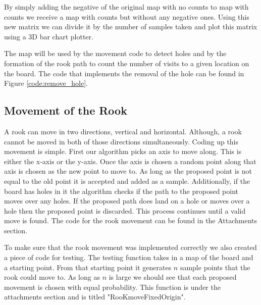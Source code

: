 \documentclass{amsart}
\numberwithin{equation}{section}
\begin{document}
By simply adding the negative of the original map with no counts to map with counts we receive a map with counts but without any negative ones. Using this new matrix we can divide it by the number of samples taken and plot this matrix using a 3D bar chart plotter. \par
The map will be used by the movement code to detect holes and by the formation of the rook path to count the number of visits to a given location on the board. The code that implements the removal of the hole can be found in Figure \ref{code:remove_hole}.

\subsection{Movement of the Rook}
A rook can move in two directions, vertical and horizontal. Although, a rook cannot be moved in both of those directions simultaneously. Coding up this movement is simple. First our algorithm picks an axis to move along. This is either the x-axis or the y-axis. Once the axis is chosen a random point along that axis is chosen as the new point to move to. As long as the proposed point is not equal to the old point it is accepted and added as a sample. Additionally, if the board has holes in it the algorithm checks if the path to the proposed point moves over any holes. If the proposed path does land on a hole or moves over a hole then the proposed point is discarded. This process continues until a valid move is found. The code for the rook movement can be found in the Attachments section. \par
To make sure that the rook movement was implemented correctly we also created a piece of code for testing. The testing function takes in a map of the board and a starting point. From that starting point it generates $n$ sample points that the rook could move to. As long as $n$ is large we should see that each proposed movement is chosen with equal probability. This function is under the attachments section and is titled "RooKmoveFixedOrigin". 
\end{document}
